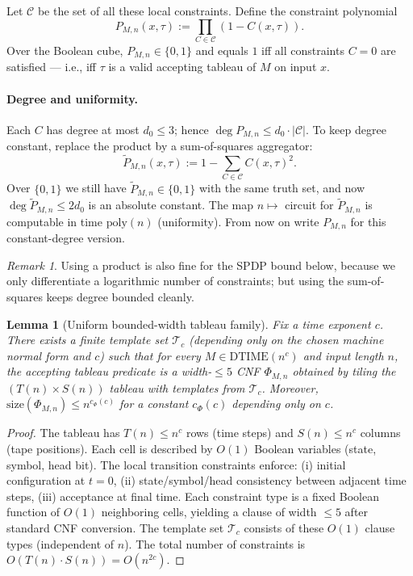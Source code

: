 \documentclass[12pt]{article}
\newtheorem{lemma}[theorem]{Lemma}
\theoremstyle{definition}
\theoremstyle{definition}
\theoremstyle{remark}
\newtheorem{remark}{Remark}
\theoremstyle{remark}
\begin{document}
Let $\mathcal{C}$ be the set of all these local constraints. Define the constraint polynomial
\[
P_{M,n}(x,\tau) := \prod_{C \in \mathcal{C}} (1 - C(x,\tau)).
\]
Over the Boolean cube, $P_{M,n} \in \{0,1\}$ and equals $1$ iff all constraints $C = 0$ are satisfied --- i.e., iff $\tau$ is a valid accepting tableau of $M$ on input $x$.

\paragraph{Degree and uniformity.}
Each $C$ has degree at most $d_0 \leq 3$; hence $\deg P_{M,n} \leq d_0 \cdot |\mathcal{C}|$. To keep degree constant, replace the product by a sum-of-squares aggregator:
\[
\widetilde{P}_{M,n}(x,\tau) := 1 - \sum_{C \in \mathcal{C}} C(x,\tau)^2.
\]
Over $\{0,1\}$ we still have $\widetilde{P}_{M,n} \in \{0,1\}$ with the same truth set, and now $\deg \widetilde{P}_{M,n} \leq 2d_0$ is an absolute constant. The map $n \mapsto$ circuit for $\widetilde{P}_{M,n}$ is computable in time $\mathrm{poly}(n)$ (uniformity). From now on write $P_{M,n}$ for this constant-degree version.

\begin{remark}
Using a product is also fine for the SPDP bound below, because we only differentiate a logarithmic number of constraints; but using the sum-of-squares keeps degree bounded cleanly.
\end{remark}

\begin{lemma}[Uniform bounded-width tableau family]
\label{lem:uniform-tableau-family}
Fix a time exponent $c$. There exists a finite template set $\mathcal{T}_c$ (depending only on the
chosen machine normal form and $c$) such that for every $M\in\mathrm{DTIME}(n^c)$ and input
length $n$, the accepting tableau predicate is a width-$\le 5$ CNF $\Phi_{M,n}$ obtained by
tiling the $(T(n)\times S(n))$ tableau with templates from $\mathcal{T}_c$.
Moreover, $\mathrm{size}(\Phi_{M,n})\le n^{c_\Phi(c)}$ for a constant $c_\Phi(c)$ depending only on $c$.
\end{lemma}

\begin{proof}
The tableau has $T(n) \le n^c$ rows (time steps) and $S(n) \le n^c$ columns (tape positions).
Each cell is described by $O(1)$ Boolean variables (state, symbol, head bit).
The local transition constraints enforce: (i) initial configuration at $t=0$,
(ii) state/symbol/head consistency between adjacent time steps,
(iii) acceptance at final time.
Each constraint type is a fixed Boolean function of $O(1)$ neighboring cells,
yielding a clause of width $\le 5$ after standard CNF conversion.
The template set $\mathcal{T}_c$ consists of these $O(1)$ clause types (independent of $n$).
The total number of constraints is $O(T(n) \cdot S(n)) = O(n^{2c})$.
\end{proof}
\end{document}
